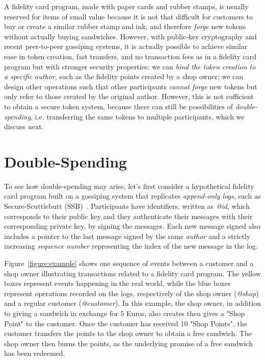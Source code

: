 \documentclass[sigplan,screen,10pt,review,anonymous]{acmart}
\begin{document}
A fidelity card program, made with paper cards and rubber stamps, is usually reserved for items of small value because it is not that difficult for customers to buy or create a similar rubber stamp and ink, and therefore \textit{forge} new tokens without actually buying sandwiches. However, with public-key cryptography and recent peer-to-peer gossiping systems, it is actually possible to achieve similar ease in token creation, fast transfers, and no transaction fees as in a fidelity card program but with stronger security properties: we can \textit{bind the token creation to a specific author}, such as the fidelity points created by a shop owner; we can design other operations such that other participants \textit{cannot forge} new tokens but only refer to those created by the original author. However, this is not sufficient to obtain a secure token system, because there can still be possibilities of \textit{double-spending}, i.e. transferring the same tokens to multiple participants, which we discuss next.

\section{Double-Spending}
\label{section:double-spending}

To see how double-spending may arise, let's first consider a hypothetical  fidelity card program built on a gossiping system that replicates \textit{append-only logs}, such as Secure-Scuttlebutt (SSB)~\cite{kermarrec2020gossiping}. Participants have identifiers, written as \textit{@id}, which corresponds to their public key and they authenticate their messages with their corresponding private key, by signing the messages. Each new message signed also includes a pointer to the last message signed by the same \textit{author} and a strictly increasing \textit{sequence number} representing the index of the new message in the log.  

Figure~\ref{figure:example} shows one sequence of events between a customer and a shop owner illustrating transactions related to a fidelity card program.  The yellow boxes represent events happening in the real world, while the blue boxes represent operations recorded on the logs, respectively of the shop owner (\textit{@shop}) and a regular customer (\textit{@customer}). In this example, the shop owner, in addition to giving a sandwich in exchange for $5$ Euros, also creates then gives  a "Shop Point" to the customer. Once the customer has received 10 "Shop Points", the customer transfers the points to the shop owner to obtain a free sandwich. The shop owner then burns the points, as the underlying promise of a free sandwich has been redeemed.
\end{document}
